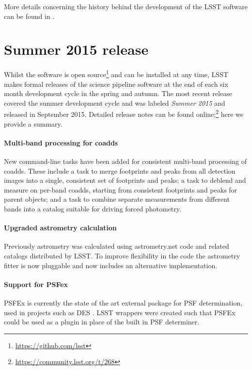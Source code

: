 \documentclass[11pt,twoside]{article}
\begin{document}
More details concerning the history behind the development of the
LSST software can be found in \citet{2010SPIE.7740E..15A}.

\section{Summer 2015 release}

Whilst the software is open
source\footnote{\url{https://github.com/lsst}} and can be installed at
any time, LSST makes formal releases of the science pipeline software
at the end of each six month development cycle in the spring and
autumn. The most recent release covered the summer development cycle
and was labeled \emph{Summer 2015} and released in September
2015. Detailed release notes can be found
online;\footnote{\url{https://community.lsst.org/t/268}} here we
provide a summary.

\paragraph{Multi-band processing for coadds} New command-line
tasks have been added for consistent multi-band processing of
coadds. These include a task to merge footprints and peaks from all
detection images into a single, consistent set of footprints and
peaks; a task to deblend and measure on per-band coadds, starting from
consistent footprints and peaks for parent objects; and a task to
combine separate measurements from different bands into a catalog
suitable for driving forced photometry.

\paragraph{Upgraded astrometry calculation} Previously astrometry was
calculated using astrometry.net code \citep{2010AJ....139.1782L} and
related catalogs distributed by LSST. To improve flexibility in the
code the astrometry fitter is now pluggable and now includes an
alternative implementation.

\paragraph{Support for PSFex} PSFEx is currently the state of the art
external package for PSF determination, used in projects such as DES
\citep{2011ASPC..442..435B}. LSST wrappers were created such that
PSFEx could be used as a plugin in place of the built in PSF
determiner.
\end{document}
